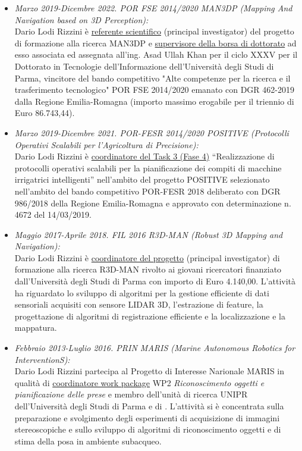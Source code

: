 \documentclass[11pt]{article}
\newcommand{\ITEMDATE}[1]{\item \textit{#1:}\\}
\begin{document}
\begin{itemize}
\begin{itemize}
\ITEMDATE{Marzo 2019-Dicembre 2022. POR FSE 2014/2020 MAN3DP (Mapping And Navigation based on 3D Perception)}
Dario Lodi Rizzini \`e \ul{referente scientifico} (principal investigator) del progetto di formazione alla ricerca MAN3DP
e \ul{supervisore della borsa di dottorato} ad esso associata ed assegnata all'ing. Asad Ullah Khan per il ciclo
XXXV per il Dottorato in Tecnologie dell'Informazione dell'Universit\`a degli Studi di Parma,
vincitore del bando competitivo "Alte competenze per la ricerca e il trasferimento tecnologico"
POR FSE 2014/2020 emanato con DGR 462-2019 dalla Regione Emilia-Romagna (importo
massimo erogabile per il triennio di Euro 86.743,44). 

\ITEMDATE{Marzo 2019-Dicembre 2021. POR-FESR 2014/2020 POSITIVE (Protocolli Operativi Scalabili per l'Agricoltura di Precisione)}
Dario Lodi Rizzini \`e \ul{coordinatore del Task 3 (Fase 4)} ``Realizzazione di protocolli operativi scalabili per la
pianificazione dei compiti di macchine irrigatrici intelligenti'' nell'ambito del progetto POSITIVE
selezionato nell'ambito del bando competitivo POR-FESR 2018 deliberato con DGR 986/2018 della Regione Emilia-Romagna e
approvato con determinazione n. 4672 del 14/03/2019.

\ITEMDATE{Maggio 2017-Aprile 2018.  FIL 2016 R3D-MAN (Robust 3D Mapping and Navigation)}
Dario Lodi Rizzini \`e \ul{coordinatore del progetto} (principal investigator) di formazione alla ricerca R3D-MAN rivolto ai giovani 
ricercatori finanziato dall'Universit\`a degli Studi di Parma con importo di Euro 4.140,00. 
L'attivit\`a ha riguardato lo sviluppo di algoritmi per la gestione efficiente di dati sensoriali 
acquisiti con sensore LIDAR 3D, l'estrazione di feature, la progettazione di algoritmi di registrazione 
efficiente e la localizzazione e la mappatura. 

\ITEMDATE{Febbraio 2013-Luglio 2016. PRIN MARIS (Marine Autonomous Robotics for InterventionS)} 
Dario Lodi Rizzini partecipa al Progetto di Interesse Narionale MARIS in qualit\`a di 
\ul{coordinatore work package} WP2 \emph{Riconoscimento oggetti e pianificazione delle prese}
e membro dell'unit\`a di ricerca UNIPR dell'Universit\`a degli Studi di Parma e di . 
L'attivit\`a si \`e concentrata sulla preparazione e svolgimento degli esperimenti
di acquisizione di immagini stereoscopiche e sullo sviluppo di algoritmi di riconoscimento 
oggetti e di stima della posa in ambiente subacqueo.

\end{itemize}



\end{itemize}
\end{document}
